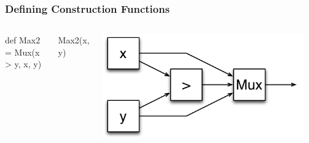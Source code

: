 \documentclass[xcolor=pdflatex,dvipsnames,table]{beamer}
\begin{document}
\begin{frame}[fragile]
\frametitle{Defining Construction Functions}

\begin{columns}


\begin{scala}
def Max2 = Mux(x > y, x, y)
\end{scala}
\begin{scala}
Max2(x, y)
\end{scala}


\begin{center}
\includegraphics[width=0.95\textwidth]{figs/Max2.pdf} \\[1cm]
\end{center}

\end{columns}

\end{frame}
\end{document}
